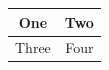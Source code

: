 \documentclass[conference,a4paper]{IEEEtran}
\begin{document}
%
%



%
\begin{table}[!t]
\begin{tabular}{|c||c|}
\hline
One & Two\\
\hline
Three & Four\\
\hline
\end{tabular}
\end{table}


\end{document}
